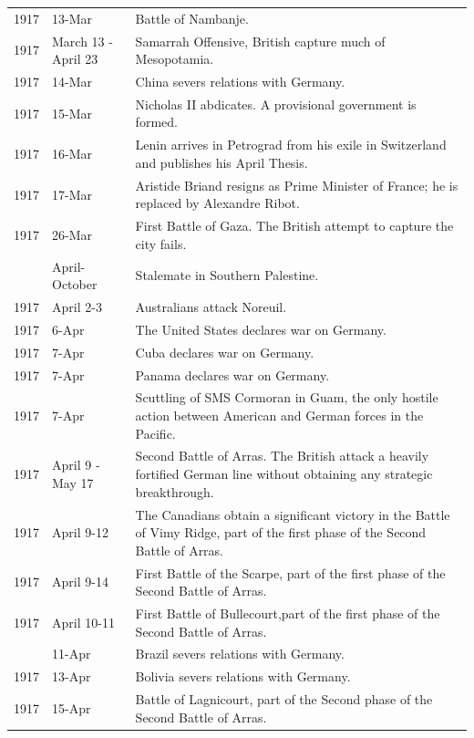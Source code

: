 \documentclass[
  openany]{book}
\begin{document}
\begin{longtable}[t]{rl>{\raggedright\arraybackslash}p{22em}}
\rowcolor{gray!6}  1917 & 13-Mar & Battle of Nambanje.\\
1917 & March 13 - April 23 & Samarrah Offensive, British capture much of Mesopotamia.\\
\addlinespace
\rowcolor{gray!6}  1917 & 14-Mar & China severs relations with Germany.\\
1917 & 15-Mar & Nicholas II abdicates. A provisional government is formed.\\
\rowcolor{gray!6}  1917 & 16-Mar & Lenin arrives in Petrograd from his exile in Switzerland and publishes his April Thesis.\\
1917 & 17-Mar & Aristide Briand resigns as Prime Minister of France; he is replaced by Alexandre Ribot.\\
\rowcolor{gray!6}  1917 & 26-Mar & First Battle of Gaza. The British attempt to capture the city fails.\\
\addlinespace
1917 & April-October & Stalemate in Southern Palestine.\\
\rowcolor{gray!6}  1917 & April 2-3 & Australians attack Noreuil.\\
1917 & 6-Apr & The United States declares war on Germany.\\
\rowcolor{gray!6}  1917 & 7-Apr & Cuba declares war on Germany.\\
1917 & 7-Apr & Panama declares war on Germany.\\
\addlinespace
\rowcolor{gray!6}  1917 & 7-Apr & Scuttling of SMS Cormoran in Guam, the only hostile action between American and German forces in the Pacific.\\
1917 & April 9 - May 17 & Second Battle of Arras. The British attack a heavily fortified German line without obtaining any strategic breakthrough.\\
\rowcolor{gray!6}  1917 & April 9-12 & The Canadians obtain a significant victory in the Battle of Vimy Ridge, part of the first phase of the Second Battle of Arras.\\
1917 & April 9-14 & First Battle of the Scarpe, part of the first phase of the Second Battle of Arras.\\
\rowcolor{gray!6}  1917 & April 10-11 & First Battle of Bullecourt,part of the first phase of the Second Battle of Arras.\\
\addlinespace
1917 & 11-Apr & Brazil severs relations with Germany.\\
\rowcolor{gray!6}  1917 & 13-Apr & Bolivia severs relations with Germany.\\
1917 & 15-Apr & Battle of Lagnicourt, part of the Second phase of the Second Battle of Arras.\\

\end{longtable}
\end{document}
